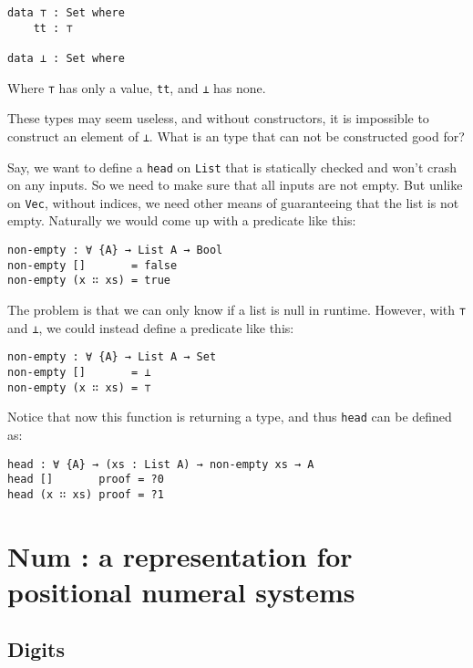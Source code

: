 \documentclass[12pt, a4paper]{article}
\begin{document}
\begin{lstlisting}
data ⊤ : Set where
    tt : ⊤

data ⊥ : Set where
\end{lstlisting}

Where {\lstinline|⊤|} has only a value, {\lstinline|tt|}, and {\lstinline|⊥|} has none.

These types may seem useless, and without constructors, it is impossible to
construct an element of {\lstinline|⊥|}. What is an type that can not be
constructed good for?

Say, we want to define a {\lstinline|head|} on {\lstinline|List|} that is
statically checked and won't crash on any inputs. So we need to make sure that
all inputs are not empty. But unlike on {\lstinline|Vec|}, without indices, we
need other means of guaranteeing that the list is not empty. Naturally we would
come up with a predicate like this:

\begin{lstlisting}
non-empty : ∀ {A} → List A → Bool
non-empty []       = false
non-empty (x ∷ xs) = true
\end{lstlisting}

The problem is that we can only know if a list is null in runtime. However, with
 {\lstinline|⊤|} and {\lstinline|⊥|}, we could instead define a predicate like this:

\begin{lstlisting}
non-empty : ∀ {A} → List A → Set
non-empty []       = ⊥
non-empty (x ∷ xs) = ⊤
\end{lstlisting}

Notice that now this function is returning a type, and thus {\lstinline|head|} can be
defined as:

\begin{lstlisting}
head : ∀ {A} → (xs : List A) → non-empty xs → A
head []       proof = ?0
head (x ∷ xs) proof = ?1
\end{lstlisting}

\section{Num : a representation for positional numeral systems}\label{representation}


\subsection{Digits}
\end{document}

